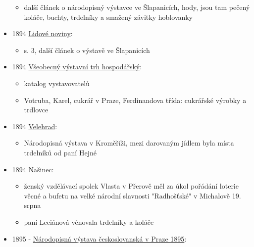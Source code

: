 \begin{itemize}
  \begin{itemize}
  \tightlist
  \item
    další článek o národopisný výstavce ve Šlapanicích, hody, jsou tam
    pečený koláče, buchty, trdelníky a smažený závitky hoblovanky
  \end{itemize}
\item
  1894
  \href{https://ceskadigitalniknihovna.cz/uuid/uuid:b8222e44-435d-11dd-b505-00145e5790ea}{Lidové
  noviny}:

  \begin{itemize}
  \tightlist
  \item
    s. 3, další článek o výstavě ve Šlapanicích
  \end{itemize}
\item
  1894
  \href{https://ndk.cz/uuid/uuid:ab9cd010-b908-11dc-83b0-000d606f5dc6}{Všeobecný
  výstavní trh hospodářský}:

  \begin{itemize}
  \tightlist
  \item
    katalog vystavovatelů
  \item
    Votruba, Karel, cukrář v Praze, Ferdinandova třída: cukrářské
    výrobky a trdlovce
  \end{itemize}
\item
  1894
  \href{https://ceskadigitalniknihovna.cz/uuid/uuid:c041b7c0-a37f-11de-95bf-000d606f5dc6}{Velehrad}:

  \begin{itemize}
  \tightlist
  \item
    Národopisná výstava v Kroměříži, mezi darovaným jídlem byla místa
    trdelníků od paní Hejné
  \end{itemize}
\item
  1894
  \href{https://ceskadigitalniknihovna.cz/uuid/uuid:a0df34ac-8228-11e0-b92b-0050569d679d}{Našinec}:

  \begin{itemize}
  \tightlist
  \item
    ženský vzdělávací spolek Vlasta v Přerově měl za úkol pořádání
    loterie věcné a bufetu na velké národní slavnosti "Radhošťské" v
    Michalově 19. srpna
  \item
    paní Leciánová věnovala trdelníky a koláče
  \end{itemize}
\item
  1895 -
  \href{https://ceskadigitalniknihovna.cz/view/uuid:a69c34d0-f3fe-11dc-a2df-000d606f5dc6?page=uuid\%3Aa5170ee0-7b0a-11e6-ad48-005056825209&fulltext=trdeln\%C3\%ADk\%20OR\%20trdeln\%C3\%ADky\%20OR\%20trdeln\%C3\%ADk\%C5\%AF&source=nkp}{
  Národopisná výstava českoslovanská v Praze 1895}:


\end{itemize}
